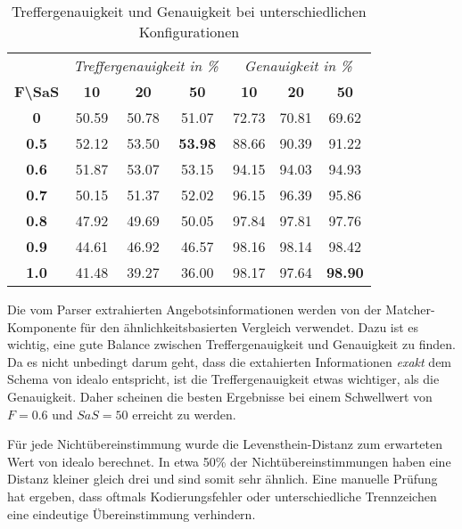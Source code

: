 \begin{table}[h]
    \centering
    \begin{tabular}{ c | c c c | c c c }
        &   \multicolumn{3}{c}{\textit{Treffergenauigkeit in \%}}    &   \multicolumn{3}{c}{\textit{Genauigkeit in \%}} \\
        \textbf{F\textbackslash SaS} & \textbf{10} & \textbf{20} & \textbf{50} & \textbf{10} & \textbf{20} & \textbf{50}  \\
        \hline
        \textbf{0}       &   50.59 &   50.78 &   51.07         &   72.73 &   70.81 &   69.62 \\
        \textbf{0.5}     &   52.12 &   53.50 &   \textbf{53.98}&   88.66 &   90.39 &   91.22 \\
        \textbf{0.6}     &   51.87 &   53.07 &   53.15         &   94.15 &   94.03 &   94.93 \\
        \textbf{0.7}     &   50.15 &   51.37 &   52.02         &   96.15 &   96.39 &   95.86 \\
        \textbf{0.8}     &   47.92 &   49.69 &   50.05         &   97.84 &   97.81 &   97.76 \\
        \textbf{0.9}     &   44.61 &   46.92 &   46.57         &   98.16 &   98.14 &   98.42 \\
        \textbf{1.0}     &   41.48 &   39.27 &   36.00         &   98.17 &   97.64 &   \textbf{98.90}

    \end{tabular}
    \caption{Treffergenauigkeit und Genauigkeit bei unterschiedlichen Konfigurationen}
    \label{tab:accuracy-precision}
\end{table}

Die vom Parser extrahierten Angebotsinformationen werden von der Matcher-Komponente für den ähnlichkeitsbasierten
Vergleich verwendet.
Dazu ist es wichtig, eine gute Balance zwischen Treffergenauigkeit und Genauigkeit zu finden.
Da es nicht unbedingt darum geht, dass die extahierten Informationen \textit{exakt} dem Schema von idealo entspricht,
ist die Treffergenauigkeit etwas wichtiger, als die Genauigkeit.
Daher scheinen die besten Ergebnisse bei einem Schwellwert von $F=0.6$ und $SaS=50$ erreicht zu werden.

Für jede Nichtübereinstimmung wurde die Levensthein-Distanz zum erwarteten Wert von idealo berechnet.
In etwa 50\% der Nichtübereinstimmungen haben eine Distanz kleiner gleich drei und sind somit sehr ähnlich.
Eine manuelle Prüfung hat ergeben, dass oftmals Kodierungsfehler oder unterschiedliche Trennzeichen eine eindeutige
Übereinstimmung verhindern.

